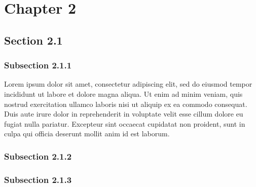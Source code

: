 \chapter{Chapter 2}
\label{chap_02}

\section{Section 2.1}


\subsection{Subsection 2.1.1}

Lorem ipsum dolor sit amet, consectetur adipiscing elit, sed do eiusmod tempor incididunt ut labore et dolore magna aliqua. Ut enim ad minim veniam, quis nostrud exercitation ullamco laboris nisi ut aliquip ex ea commodo consequat. Duis aute irure dolor in reprehenderit in voluptate velit esse cillum dolore eu fugiat nulla pariatur. Excepteur sint occaecat cupidatat non proident, sunt in culpa qui officia deserunt mollit anim id est laborum.


\subsection{Subsection 2.1.2}


\subsection{Subsection 2.1.3}


